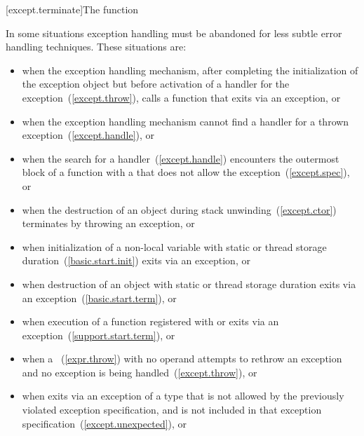 [except.terminate]{The  function}

\pnum
{}%
In some situations exception handling must be abandoned
for less subtle error handling techniques. \enternote These situations are:

%
\begin{itemize}
\item%
when the exception handling mechanism, after completing
the initialization of the exception object
but before
activation of a handler for the exception~(\ref{except.throw}),
calls a function that exits
via an exception, or

\item%
when the exception handling mechanism cannot find a handler for a thrown exception~(\ref{except.handle}), or

\item when the search for a handler~(\ref{except.handle}) encounters the
outermost block of a function with a 
that does not allow the exception~(\ref{except.spec}), or

\item%
when the destruction of an object during stack unwinding~(\ref{except.ctor})
terminates by throwing an exception, or

\item%
when initialization of a non-local
variable with static or thread storage duration~(\ref{basic.start.init})
exits via an exception, or

\item%
when destruction of an object with static or thread storage duration exits
via an exception~(\ref{basic.start.term}), or

\item%
when execution of a function registered with
 or 
exits via an exception~(\ref{support.start.term}), or

\item%
when a
~(\ref{expr.throw})
with no operand attempts to rethrow an exception and no exception is being
handled~(\ref{except.throw}), or

\item%
when
exits via an exception
of a type
that is not allowed by the previously violated
exception specification,
and
is not included in that
exception specification~(\ref{except.unexpected}), or


\end{itemize}
